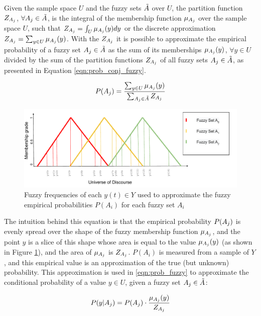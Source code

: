 Given the sample space $U$ and the fuzzy sets $\tilde{A}$ over $U$, the partition function $Z_{A_j}$, $\forall A_j \in \tilde{A}$, is the integral of the membership function $\mu_{A_j}$ over the sample space $U$, such that $Z_{A_j} = \int_U \mu_{A_j}(y) dy$ or the discrete approximation $Z_{A_j} = \sum_{y \in U} \mu_{A_j}(y)$. With the $Z_{A_j}$ it is possible to approximate the empirical probability of a fuzzy set $A_j \in \tilde{A}$ as the sum of its memberships $\mu_{A_j}(y)$, $\forall y \in U$ divided by the sum of the partition functions $Z_{A_j}$ of all fuzzy sets $A_j \in \tilde{A}$, as presented in Equation \eqref{eqn:prob_conj_fuzzy}. 

\begin{equation}
P(A_j) = \frac{\sum_{y \in U} \mu_{A_j}(y)}{\sum_{A_j \in \tilde{A}}Z_{A_j}} 
\label{eqn:prob_conj_fuzzy}
\end{equation}

\begin{figure}
    \centering
    \includegraphics[width=\textwidth]{figures/pwfts_fuzzyfrequency.pdf}
    \caption{Fuzzy frequencies of each $y(t) \in Y$ used to approximate the fuzzy empirical probabilities $P(A_i)$ for each fuzzy set $A_i$}
    \label{fig:pwfts_fuzzyfrequency}
\end{figure}

The intuition behind this equation is that the empirical probability $P(A_j)$ is evenly spread over the shape of the fuzzy membership function $\mu_{A_j}$, and the point $y$ is a slice of this shape whose area is equal to the value $\mu_{A_j}(y)$ (as shown in Figure \ref{fig:pwfts_fuzzyfrequency}), and the area of $\mu_{A_j}$ is $Z_{A_j}$. $P(A_i)$ is measured from a sample of $Y$, and this empirical value is an approximation of the true (but unknown) probability. This approximation is used in \eqref{eqn:prob_fuzzy} to approximate the conditional probability of a value $y \in U$, given a fuzzy set $A_j \in \tilde{A}$:

\begin{equation}
P(y | A_j) = P(A_j) \cdot \frac{\mu_{A_j}(y)}{Z_{A_j}}
\label{eqn:prob_fuzzy}
\end{equation}

